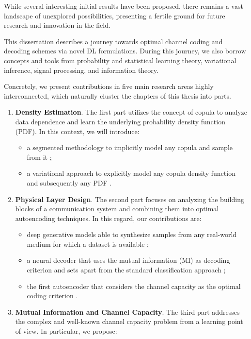 While several interesting initial results have been proposed, there remains a vast landscape of unexplored possibilities, presenting a fertile ground for future research and innovation in the field.

This dissertation describes a journey towards optimal channel coding and decoding schemes via novel DL formulations. During this journey, we also borrow concepts and tools from probability and statistical learning theory, variational inference, signal processing, and information theory.

Concretely, we present contributions in five main research areas highly interconnected, which naturally cluster the chapters of this thesis into parts.
\begin{enumerate}
    \item \textbf{Density Estimation}. The first part utilizes the concept of copula to analyze data dependence and learn the underlying probability density function (PDF).
In this context, we will introduce:
\begin{itemize}
    \item a segmented methodology to implicitly model any copula and sample from it \cite{Letizia2020};
    \item a variational approach to explicitly model any copula density function and subsequently any PDF \cite{letizia2022copula}.
\end{itemize}
    \item \textbf{Physical Layer Design}. The second part focuses on analyzing the building blocks of a communication system and combining them into optimal autoencoding techniques.  
In this regard, our contributions are:
\begin{itemize}
    \item deep generative models able to synthesize samples from any real-world medium for which a dataset is available \cite{ML_PLC, Letizia2019a};
    \item a neural decoder that uses the mutual information (MI) as decoding criterion and sets apart from the standard classification approach \cite{tonello2022mind};
    \item the first autoencoder that considers the channel capacity as the optimal coding criterion \cite{Letizia2021}.
\end{itemize}
    \item \textbf{Mutual Information and Channel Capacity}. The third part addresses the complex and well-known channel capacity problem from a learning point of view. In particular, we propose:

\end{enumerate}
